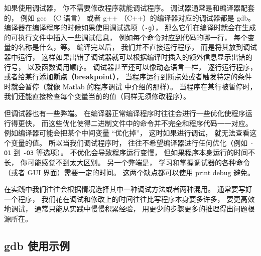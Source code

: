 如果使用调试器， 你不需要修改程序就能调试程序。 调试器通常是和编译器配套的， 例如 gcc （C 语言） 或者 g++ （C++）的编译器对应的调试器都是 gdb。 编译器在编译程序的时候如果使用调试选项（\verb|-g|）， 那么它们在编译时就会在生成的可执行文件中插入一些调试信息， 例如每个命令对应到代码的哪一行， 每个变量的名称是什么，等。 编译完以后， 我们并不直接运行程序， 而是将其放到调试器中运行， 这样如果出错了调试器就可以根据编译时插入的额外信息显示出错的行号， 以及函数调用顺序。 调试器甚至还可以像动态语言一样， 逐行运行程序， 或者给某行添加\textbf{断点（breakpoint）}， 当程序运行到断点处或者触发特定的条件时就会暂停（就像 Matlab 的程序调试 中介绍的那样）。 当程序在某行被暂停时， 我们还能直接检查每个变量当前的值（同样无须修改程序）。

但调试器也有一些弊端。 在编译器正常编译程序时往往会进行一些优化使程序运行得更快， 而这些优化使得二进制文件中的命令并不完全和程序代码一一对应。 例如编译器可能会把某个中间变量 “优化掉”， 这时如果进行调试， 就无法查看这个变量的值。 所以当我们调试程序时， 往往不希望编译器进行任何优化（例如 \verb|-O1| 到 \verb|-O3| 等选项）。 不优化会导致程序运行变慢， 但如果程序本身运行的时间不长， 你可能感觉不到太大区别。 另一个弊端是， 学习和掌握调试器的各种命令（或者 GUI 界面）需要一定的时间。 这两个缺点都可以使用 print debug 避免。

在实践中我们往往会根据情况选择其中一种调试方法或者两种混用。 通常要写好一个程序， 我们花在调试和修改上的时间往往比写程序本身要多许多， 要更高效地调试， 通常只能从实践中慢慢积累经验， 用更少的步骤更多的推理得出问题根源所在。

\subsection{gdb 使用示例}

